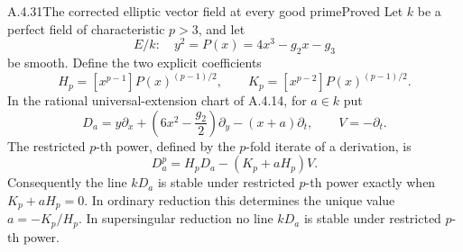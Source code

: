 \begin{result}{A.4.31}{The corrected elliptic vector field at every good prime}{Proved}
Let $k$ be a perfect field of characteristic $p>3$, and let
\[
 E/k:\quad y^2=P(x)=4x^3-g_2x-g_3
\]
be smooth. Define the two explicit coefficients
\[
 H_p=[x^{p-1}]P(x)^{(p-1)/2},\qquad
 K_p=[x^{p-2}]P(x)^{(p-1)/2}.
\]
In the rational universal-extension chart of A.4.14, for $a\in k$ put
\[
 D_a=y\partial_x+
       \left(6x^2-\frac{g_2}{2}\right)\partial_y
       -(x+a)\partial_t,\qquad V=-\partial_t.
\]
The restricted $p$-th power, defined by the $p$-fold iterate of a
derivation, is
\[
 \boxed{\quad D_a^p=H_pD_a-(K_p+aH_p)V.\quad}
\]
Consequently the line $kD_a$ is stable under restricted $p$-th power
exactly when $K_p+aH_p=0$. In ordinary reduction this determines
the unique value $a=-K_p/H_p$. In supersingular reduction no
line $kD_a$ is stable under restricted $p$-th power.
\end{result}

